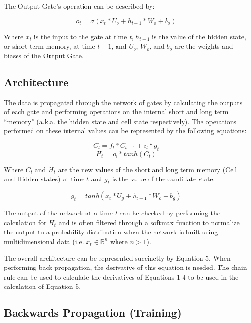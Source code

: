 \documentclass[12pt]{article}
\begin{document}
The Output Gate's operation can be described by:

\begin{equation}
    o_t = \sigma(x_t*U_o + h_{t-1}*W_o + b_o)
\end{equation}

Where $x_t$ is the input to the gate at time \emph{t}, $h_{t-1}$ is the value
of the hidden state, or short-term memory, at time $t - 1$, and $U_o$, $W_o$,
and $b_o$ are the weights and biases of the Output Gate.

\subsection{Architecture}

The data is propagated through the network of gates by calculating the outputs
of each gate and performing operations on the internal short and long term
``memory'' (a.k.a. the hidden state and cell state respectively). The
operations performed on these internal values can be represented by the
following equations:

\begin{equation}
    C_t = f_t*C_{t-1} + i_t*g_t
\end{equation}
\begin{equation}
    H_t = o_t*tanh(C_t)
\end{equation}

Where $C_t$ and $H_t$ are the new values of the short and long term memory
(Cell and Hidden states) at time $t$ and $g_t$ is the value of the candidate
state:

\begin{equation}
    g_t = tanh(x_t*U_g + h_{t-1}*W_o + b_g)
\end{equation}

The output of the network at a time $t$ can be checked by performing the
calculation for $H_t$ and is often filtered through a softmax function to
normalize the output to a probability distribution when the network is built
using multidimensional data (i.e. $x_t \in \mathbb{R}^n$ where $n > 1$).

The overall architecture can be represented succinctly by Equation 5. When
performing back propagation, the derivative of this equation is needed. The
chain rule can be used to calculate the derivatives of Equations 1-4 to be used
in the calculation of Equation 5.

\subsection{Backwards Propagation  (Training)}
\end{document}
